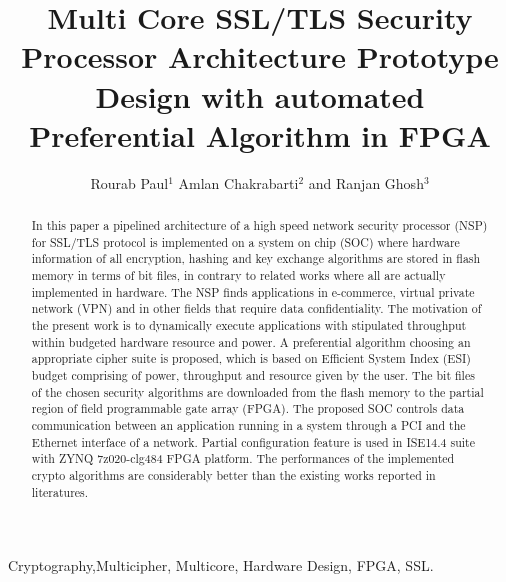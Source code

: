 \documentclass[3p,times]{elsarticle}
\begin{document}
\begin{frontmatter}



\dochead{}

\title{Multi Core SSL/TLS Security Processor Architecture  Prototype Design with automated Preferential Algorithm in FPGA}



\author{Rourab Paul$^1$ 
Amlan Chakrabarti$^2$ and Ranjan Ghosh$^3$
}

\address{A.K.Choudhury School of Information Technology1,5 , Dept. of Computer Science and Engineering2 and 
Institute of Radio Physics and Electronics3,4,6, 
University of Calcutta, 92 A. P. C. Road, Kolkata–700 009, India.
}

\begin{abstract}
In this paper a pipelined architecture of a high speed network security processor (NSP) for SSL/TLS protocol is implemented on a system on chip (SOC) where hardware information of all encryption, hashing and key exchange algorithms are stored in flash memory in terms of bit files, in contrary to related works where all are actually implemented in hardware. The NSP finds applications in e-commerce, virtual private network (VPN) and in other fields that require data confidentiality. The motivation of the present work is to dynamically execute applications with stipulated throughput within budgeted hardware resource and power. A preferential algorithm choosing an appropriate cipher suite is proposed, which is based on Efficient System Index (ESI) budget comprising of power, throughput and resource given by the user. The bit files of the chosen security algorithms are downloaded from the flash memory to the partial region of field programmable gate array (FPGA). The proposed SOC controls data communication between an application running in a system through a PCI and the Ethernet interface of a network. Partial configuration feature is used in ISE14.4 suite with ZYNQ 7z020-clg484 FPGA platform. The performances of the implemented crypto algorithms are considerably better than the existing works reported in literatures. 
\end{abstract}

\begin{keyword}
Cryptography,Multicipher, Multicore, Hardware Design, FPGA, SSL. 



\end{keyword}

\end{frontmatter}
\end{document}
